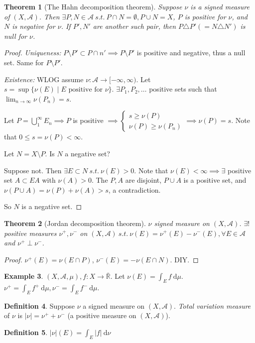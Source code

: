 \documentclass{report}
\newcommand{\R}{\mathbb{R}}
\newcommand{\st}{\ s.t.\ }
\newcommand{\cA}{\mathcal{A}}
\newcommand{\df}{\ \mathrm{d}}
\newtheorem{theorem}{Theorem}[chapter]
\theoremstyle{definition}
\newtheorem{definition}[theorem]{Definition}
\newtheorem{example}[theorem]{Example}
\theoremstyle{remark}
\begin{document}
\begin{theorem}[The Hahn decomposition theorem]
	Suppose $\nu$ is a signed measure of $(X, \cA)$. Then $\exists P, N \in \cA \st P \cap N = \emptyset, P \cup N = X$, $P$ is positive for $\nu$, and $N$ is negative for $\nu$. If $P', N'$ are another such pair, then $P \triangle P' (= N \triangle N')$ is null for $\nu$.
\end{theorem}
\begin{proof}
	\emph{Uniqueness:} $P \setminus P' \subset P \cap n' \implies P \setminus P'$ is positive and negative, thus a null set. Same for $P \setminus P'$.

	\emph{Existence:} WLOG assume $\nu: \cA \to [-\infty, \infty)$. Let $s = \sup\{\nu(E) \mid E \text{ positive for } \nu\}$. $\exists P_1, P_2, \ldots$ positive sets such that $\lim_{n \to \infty} \nu(P_n) = s$. 
	
	Let $P = \displaystyle\bigcup_1^\infty E_n \implies P$ is positive $\implies \begin{cases}
		s \geq \nu(P) \\
		\nu(P) \geq \nu(P_n)
	\end{cases} \implies \nu(P) = s$. Note that $0 \leq s = \nu(P) < \infty$.

	Let $N = X \setminus P$. Is $N$ a negative set?

	Suppose not. Then $\exists E \subset N \st \nu(E) > 0$. Note that $\nu(E) < \infty \implies \exists$ positive set  $A \subset EA$ with $\nu(A) > 0$. The $P, A$ are disjoint, $P \cup A$ is a positive set, and $\nu(P \cup A) = \nu(P) + \nu(A) > s$, a contradiction. 

	So $N$ is a negative set.
\end{proof}

\begin{theorem}[Jordan decomposition theorem]
	$\nu$ signed measure on $(X, \cA)$. $\exists!$ positive measures $\nu^+, \nu^-$ on $(X, \cA) \st \nu(E) = \nu^+(E) - \nu^-(E), \forall E \in \cA$ and $\nu^+ \perp \nu^-$.
\end{theorem}
\begin{proof}
	$\nu^+(E) = \nu(E \cap P)$, $\nu^-(E) = - \nu(E \cap N)$. DIY.
\end{proof}
\begin{example}
	$(X, \cA, \mu), f: X \to \bar{\R}$. Let $\nu(E) = \int_E f \df \mu$. $\nu^+ = \int_E f^+ \df \mu, \nu^- = \int_E f^- \df \mu$.
\end{example}

\begin{definition}
	Suppose $\nu$ a signed measure on $(X, \cA)$. \emph{Total variation measure} of $\nu$ is $|\nu| = \nu^+ + \nu^-$ (a positive measure on $(X, \cA)$).
\end{definition}
\begin{definition}
	$|\nu|(E)= \int_E |f| \df \nu$
\end{definition}
\end{document}
